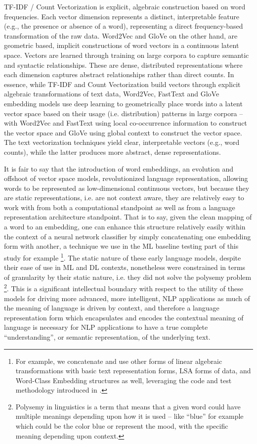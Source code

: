 \documentclass[final]{clv2025}
\begin{document}
TF-IDF / Count Vectorization is explicit, algebraic construction based on word frequencies. Each vector dimension represents a distinct, interpretable feature (e.g., the presence or absence of a word), representing a direct frequency-based transformation of the raw data. Word2Vec and GloVe on the other hand, are geometric based, implicit constructions of word vectors in a continuous latent space. Vectors are learned through training on large corpora to capture semantic and syntactic relationships. These are dense, distributed representations where each dimension captures abstract relationships rather than direct counts.  In essence, while TF-IDF and Count Vectorization build vectors through explicit algebraic transformations of text data, Word2Vec, FastText and GloVe embedding models use deep learning to geometrically place words into a latent vector space based on their usage (i.e. distribution) patterns in large corpora – with Word2Vec and FastText using local co-occurrence information to construct the vector space and GloVe using global context to construct the vector space. The text vectorization techniques yield clear, interpretable vectors (e.g., word counts), while the latter produces more abstract, dense representations.

It is fair to say that the introduction of word embeddings, an evolution and offshoot of vector space models, revolutionized language representation, allowing words to be represented as low-dimensional continuous vectors, but because they are static representations, i.e. are not context aware, they are relatively easy to work with from both a computational standpoint as well as from a language representation architecture standpoint. That is to say, given the clean mapping of a word to an embedding, one can enhance this structure relatively easily within the context of a neural network classifier by simply concatenating one embedding form with another, a technique we use in the ML baseline testing part of this study for example \footnote{  For example, we concatenate and use other forms of linear algebraic transformations with basic text representation forms, LSA forms of data, and Word-Class Embedding structures as well, leveraging the code and test methodology introduced in \cite{moreo}.}.  The static nature of these early language models, despite their ease of use in ML and DL contexts, nonetheless were constrained in terms of granularity by their static nature, i.e. they did not solve the polysemy problem \footnote{Polysemy in linguistics is a term that means that a given word could have multiple meanings depending upon how it is used – like “blue” for example which could be the color blue or represent the mood, with the specific meaning depending upon context.}. This is a significant intellectual boundary with respect to the utility of these models for driving more advanced, more intelligent, NLP applications as much of the meaning of language is driven by context, and therefore a language representation form which encapsulates and encodes the contextual meaning of language is necessary for NLP applications to have a true complete “understanding”, or semantic representation, of the underlying text.  
\end{document}
